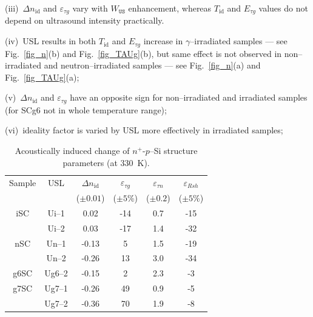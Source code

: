 \documentclass[aip,jap, amsmath,amssymb,reprint]{revtex4-1}
\begin{document}
\noindent
(iii)~$\Delta n_{\mathrm{id}}$ and $\varepsilon_{\tau g}$ vary with $W_{\mathtt{US}}$ enhancement, whereas $T_{\mathrm{id}}$ and $E_{\tau g}$ values do not depend on ultrasound intensity practically.


\noindent
(iv)~USL results in both $T_{\mathrm{id}}$ and $E_{\tau g}$ increase in $\gamma$--irradiated samples --- see Fig.~\ref{fig_n}(b) and Fig.~\ref{fig_TAUg}(b), but same effect is not observed in non--irradiated and neutron--irradiated samples --- see Fig.~\ref{fig_n}(a) and Fig.~\ref{fig_TAUg}(a);

\noindent
(v)~$\Delta n_{\mathrm{id}}$ and $\varepsilon_{\tau g}$ have an opposite sign for non--irradiated and irradiated samples
(for SCg6 not in whole temperature range);

\noindent
(vi)~ideality factor is varied by USL more effectively in irradiated samples;






\begin{table}
\caption{\label{tabAIchange}Acoustically induced change of $n^+$-$p$--Si structure parameters (at 330~K).
}
\begin{ruledtabular}
\begin{tabular}{cccccc}
Sample&USL&$\Delta n_{\mathrm{id}}$ &$\varepsilon_{\tau g}$ &$\varepsilon_{\tau n}$ &$\varepsilon_{Rsh}$ \\
&&\mbox{($\pm0.01$)}&($\pm5$\%)&($\pm0.2$)&($\pm5$\%)\\
\hline
iSC&Ui--1&0.02&-14&0.7&-15\\
&Ui--2&0.03&-17&1.4&-32\\
nSC&Un--1&-0.13&5&1.5&-19\\
&Un--2&-0.26&13&3.0&-34\\
g6SC&Ug6--2&-0.15&2&2.3&-3\\
g7SC&Ug7--1&-0.26&49&0.9&-5\\
&Ug7--2&-0.36&70&1.9&-8\\
\end{tabular}
\end{ruledtabular}
\end{table}
\end{document}
